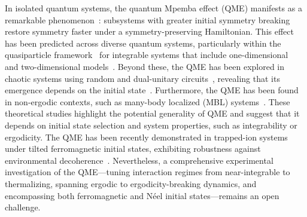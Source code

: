 \documentclass[reprint,superscriptaddress,preprintnumbers,longbibliography,
amsmath,amssymb,aps,floatfix,pra,twocolumn, tightenlines %
]{revtex4-2}
\begin{document}
In isolated quantum systems, the quantum Mpemba effect (QME) manifests as a remarkable phenomenon~\cite{EA_probe,NRP2025,QME_symm_presp_2025}: subsystems with greater initial symmetry breaking restore symmetry faster under a symmetry-preserving Hamiltonian. This effect has been predicted across diverse quantum systems, particularly within the quasiparticle framework~\cite{Integrable_PRL,quasiparticle,integrable_arxiv} for integrable systems that include one-dimensional~\cite{XY_chain,XX_chain,mixed_states_dephase_prb,z2_XY_chain_2024,Heisenberg_chain,Rule54} and two-dimensional models~\cite{2d_free_fermion,optical_pra}.
Beyond these, the QME has been explored in chaotic systems using random and dual-unitary circuits~\cite{Translation_symmetry_random_2025,dual_unitary_circuits_PRXQ}, revealing that its emergence depends on the initial state~\cite{random_circuits_2024,random_circuits_2025}. 
Furthermore, the QME has been found in non-ergodic contexts, such as many-body localized (MBL) systems~\cite{QME_MBL}. These theoretical studies highlight the potential generality of QME and suggest that it depends on initial state selection and system properties, such as integrability or ergodicity. The QME has been recently demonstrated in trapped-ion systems under tilted ferromagnetic initial states, exhibiting robustness against environmental decoherence~\cite{QME_trapped_ion}. Nevertheless, a comprehensive experimental investigation of the QME—tuning interaction regimes from near-integrable to thermalizing, spanning ergodic to ergodicity-breaking dynamics, and encompassing both ferromagnetic and Néel initial states—remains an open challenge.
\end{document}
